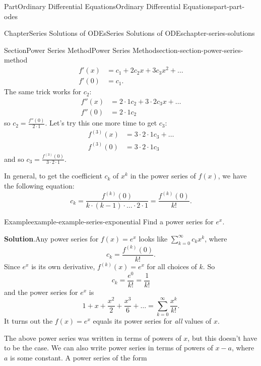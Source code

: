 \documentclass[twoside,10pt,]{book}
\newcommand{\blocktitlefont}{\relax}
\numberwithin{equation}{part}
\begin{document}
\begin{partptx}{Part}{Ordinary Differential Equations}{}{Ordinary Differential Equations}{}{}{part-part-odes}
\begin{chapterptx}{Chapter}{Series Solutions of ODEs}{}{Series Solutions of ODEs}{}{}{chapter-series-solutions}
\begin{sectionptx}{Section}{Power Series Method}{}{Power Series Method}{}{}{section-section-power-series-method}
\begin{align*}
f'(x) &= c_{1} + 2c_{2}x + 3c_{3}x^{2} + \dots\\
f'(0) &= c_{1}\text{.}
\end{align*}
The same trick works for \(c_{2}\):%
\begin{align*}
f''(x) &= 2\cdot1c_{2} + 3\cdot2c_{3}x+\dots\\
f''(0) &= 2\cdot1c_{2}
\end{align*}
so \(c_{2} = \frac{f''(0)}{2\cdot1}\). Let's try this one more time to get \(c_{3}\):%
\begin{align*}
f^{(3)}(x) &= 3\cdot2\cdot1c_{3} + \dots\\
f^{(3)}(0) &= 3\cdot2\cdot1c_{3}
\end{align*}
and so \(c_{3} = \frac{f^{(3)}(0)}{3\cdot2\cdot1}\).%
\par
In general, to get the coefficient \(c_{k}\) of \(x^{k}\) in the power series of \(f(x)\), we have the following equation:%
%
\begin{equation}
c_{k} = \frac{f^{(k)}(0)}{k\cdot(k-1)\cdot\dots\cdot2\cdot1} = \frac{f^{(k)}(0)}{k!}.\label{men-equation-power-series-coefficients-at-zero}
\end{equation}
\begin{example}{Example}{}{example-example-series-exponential}%
Find a power series for \(e^{x}\).%
\par\smallskip%
\noindent\textbf{\blocktitlefont Solution}.\hypertarget{solution-example-series-exponential-b}{}\quad{}Any power series for \(f(x) = e^{x}\) looks like \(\sum_{k=0}^{\infty}c_{k}x^{k}\), where%
\begin{equation*}
c_{k} = \frac{f^{(k)}(0)}{k!}.
\end{equation*}
Since \(e^{x}\) is its own derivative, \(f^{(k)}(x) = e^{x}\) for all choices of \(k\). So%
\begin{equation*}
c_{k} = \frac{e^{0}}{k!} = \frac{1}{k!}
\end{equation*}
and the power series for \(e^{x}\) is%
\begin{equation*}
1+x+\frac{x^{2}}{2}+\frac{x^{3}}{6} + \dots = \sum_{k=0}^{\infty}\frac{x^{k}}{k!}.
\end{equation*}
It turns out the \(f(x) = e^{x}\) equals its power series for \emph{all} values of \(x\).%
\end{example}
The above power series was written in terms of powers of \(x\), but this doesn't have to be the case. We can also write power series in terms of powers of \(x-a\), where \(a\) is some constant. A power series of the form%

\end{sectionptx}
\end{chapterptx}
\end{partptx}
\end{document}
